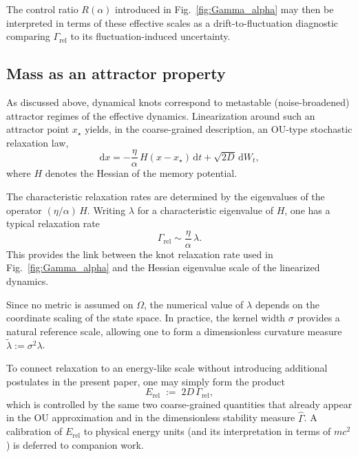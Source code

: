 \documentclass[reprint,amsmath,amssymb,aps,prd,nofootinbib,floatfix]{revtex4-2}
\begin{document}
The control ratio $R(\alpha)$ introduced in Fig.~\ref{fig:Gamma_alpha} may then be interpreted in terms of these effective scales as a drift-to-fluctuation diagnostic comparing $\Gamma_{\mathrm{rel}}$ to its fluctuation-induced uncertainty.

\subsection{Mass as an attractor property}

As discussed above, dynamical knots correspond to metastable (noise-broadened) attractor regimes of the effective dynamics.
Linearization around such an attractor point $x_\star$ yields, in the coarse-grained description, an OU-type stochastic relaxation law,
\begin{equation}
\mathrm{d}x = - \frac{\eta}{\alpha}\, H (x - x_\star)\,\mathrm{d}t + \sqrt{2D}\,\mathrm{d}W_t,
\end{equation}
where $H$ denotes the Hessian of the memory potential.

The characteristic relaxation rates are determined by the eigenvalues of the operator
$(\eta/\alpha)\, H$. Writing $\lambda$ for a characteristic eigenvalue of $H$, one has a typical relaxation rate
\begin{equation}
\Gamma_{\mathrm{rel}} \sim \frac{\eta}{\alpha}\,\lambda.
\end{equation}
This provides the link between the knot relaxation rate used in Fig.~\ref{fig:Gamma_alpha} and the Hessian eigenvalue scale of the linearized dynamics.

Since no metric is assumed on $\Omega$, the numerical value of $\lambda$ depends on the coordinate scaling of the state space. In practice, the kernel width $\sigma$ provides a natural reference scale, allowing one to form a dimensionless curvature measure $\tilde{\lambda} := \sigma^2\lambda$.

To connect relaxation to an energy-like scale without introducing additional postulates in the present paper, one may simply form the product
\begin{equation}
E_{\mathrm{rel}} \;:=\; 2D\,\Gamma_{\mathrm{rel}},
\end{equation}
which is controlled by the same two coarse-grained quantities that already appear in the OU approximation and in the dimensionless stability measure $\widehat{\Gamma}$. A calibration of $E_{\mathrm{rel}}$ to physical energy units (and its interpretation in terms of $mc^2$) is deferred to companion work.
\end{document}
